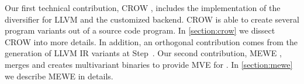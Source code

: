 Our first technical contribution, CROW  \cite{CROW}, includes the implementation of the diversifier for LLVM and the customized \wasm backend. CROW is able to create several \wasm program variants out of a source code program. In \autoref{section:crow} we dissect CROW into more details.
In addition, an orthogonal contribution comes from the generation of LLVM IR variants at Step~. Our second contribution, MEWE  \cite{MEWE}, merges and creates multivariant binaries to provide MVE for \wasm {}. In \autoref{section:mewe} we describe MEWE in details.


